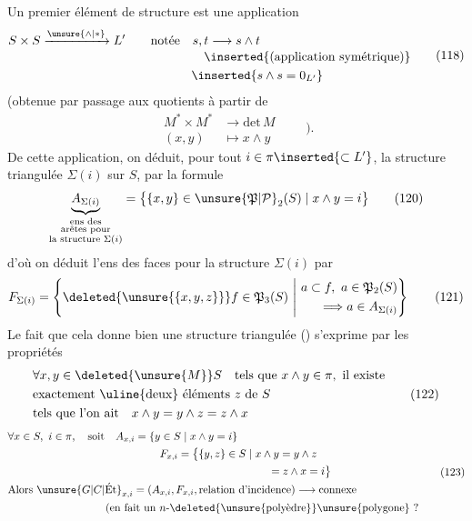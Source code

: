 Un premier élément de structure est une application
\[
\begin{aligned}
S\times S&\xrightarrow{\unsure{\wedge|*}}L'\qquad \text{notée}\quad s,t\longrightarrow s\wedge t\\[-2pt]
&\hspace{13em}\inserted{\text{(application symétrique)}}\\
&\hspace{12em}\inserted{s\wedge s=0_{L'}}
\end{aligned}\tag*{(118)}
\]
(obtenue par passage aux quotients à partir de
\[
\begin{aligned}
M^*\times M^*&\longrightarrow\mathrm{det}\,M\\
(x,y)&\longmapsto x\wedge y
\end{aligned}\qquad).\tag*{(119)}
\]
De cette application, on déduit,  pour tout $i\in\pi\inserted{\subset L'}$, la structure triangulée $\Sigma(i)$ sur $S$, par la formule
\[
\underbrace{A_{\Sigma(i)}}_{\substack{\text{ens des}\\\text{arêtes pour}\\\text{la structure }\Sigma(i)}}=
\bigl\{\{x,y\}\in\unsure{\mathfrak P|\mathcal P}_2(S)\mid x\wedge y=i\bigr\}\tag*{(120)}
\]
d'où on déduit l'ens des faces pour la structure $\Sigma(i)$ par
\[
F_{\Sigma(i)}=\left\{\deleted{\unsure{\{x,y,z\}}} f\in\mathfrak P_3(S)\ \middle|\ 
\begin{aligned}a\subset f,\ a\in\mathfrak P_2(S)\\ \Longrightarrow a\in A_{\Sigma(i)}\end{aligned}\right\}\tag*{(121)}
\]
Le fait que cela donne bien une structure triangulée () s'exprime par les  propriétés
\[
\begin{aligned}
&\forall x,y\in\deleted{\unsure{M}}S\quad\text{tels que }x\wedge y\in\pi,\ \text{il existe}\\
&\text{exactement \uline{deux} éléments }z\text{ de }S\\
&\text{tels que l'on ait}\quad x\wedge y=y\wedge z=z\wedge x
\end{aligned}\tag*{(122)}
\]
\[
\begin{aligned}
&\forall x\in S,\ i\in\pi,\quad\text{soit}\quad A_{x,i}=\{y\in S\mid x\wedge y=i\}\\
&\hspace{14em}F_{x,i}=\bigl\{\{y,z\}\in S\mid x\wedge y=y\wedge z\\
&\hspace{24em}=z\wedge x=i\bigr\}\\
&\text{Alors }\unsure{G|C|\mathrm{\acute Et}}_{x,i}=(A_{x,i},F_{x,i},\text{relation d'incidence})\longrightarrow \text{connexe}\\
&\hspace{9em}\text{(en fait un $n$-\deleted{\unsure{polyèdre}}\unsure{polygone} ?}
\end{aligned}\tag*{(123)}
\]

